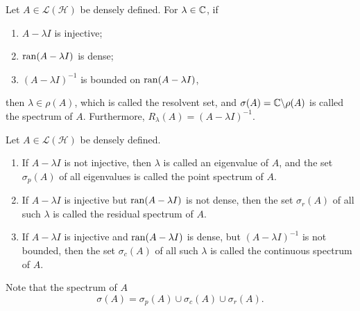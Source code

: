 \documentclass[a4paper,12pt]{article}
\begin{document}
\begin{defn}
    Let $A \in \mathcal{L}(\mathcal{H})$ be densely defined. For $\lambda \in \mathbb{C}$, if
    \begin{enumerate}[label=(\arabic{*})]
        \item $A - \lambda I$ is injective;
        \item $\operatorname{ran} (A - \lambda I)$ is dense;
        \item $(A - \lambda I)^{-1}$ is bounded on $\operatorname{ran} (A - \lambda I)$,
    \end{enumerate}
    then $\lambda \in \rho(A)$, which is called the resolvent set, and $\sigma(A) = \mathbb{C} \backslash \rho(A)$ is called the spectrum of $A$. Furthermore, $R_\lambda(A) = (A - \lambda I)^{-1}$.
\end{defn}

\begin{defn}[Spectrum]
    Let $A \in \mathcal{L}(\mathcal{H})$ be densely defined. 
    \begin{enumerate}[label=(\arabic{*})]
        \item If $A - \lambda I$ is not injective, then $\lambda$ is called an eigenvalue of $A$, and the set $\sigma_p(A)$ of all eigenvalues is called the point spectrum of $A$.

        \item If $A - \lambda I$ is injective but $\operatorname{ran} (A - \lambda I)$ is not dense, then the set $\sigma_r(A)$ of all such $\lambda$ is called the residual spectrum of $A$.

        \item If $A - \lambda I$ is injective and $\operatorname{ran} (A - \lambda I)$ is dense, but $(A - \lambda I)^{-1}$ is not bounded, then the set $\sigma_c(A)$ of all such $\lambda$ is called the continuous spectrum of $A$.
    \end{enumerate}
\end{defn}
\begin{rmk}
    Note that the spectrum of $A$
    \begin{equation*}
        \sigma(A) = \sigma_p(A) \cup \sigma_c(A) \cup \sigma_r(A).
    \end{equation*}
\end{rmk}
\end{document}
